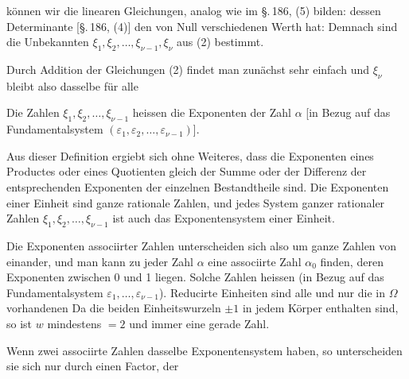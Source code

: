können wir die linearen Gleichungen, analog wie im \S.\,186, (5)
bilden:
dessen Determinante [\S.\,186, (4)] den von Null verschiedenen
Werth hat:
Demnach sind die Unbekannten $\xi_1, \xi_2, \ldots, \xi_{\nu-1}, \xi_\nu$ aus (2)
 bestimmt.

Durch Addition der Gleichungen (2) findet man zunächst
sehr einfach
und $\xi_\nu$ bleibt also dasselbe für alle 

Die Zahlen $\xi_1, \xi_2, \ldots, \xi_{\nu-1}$ heissen die Exponenten der
Zahl $\alpha$ [in Bezug auf das Fundamentalsystem $(\varepsilon_1, \varepsilon_2, \ldots, \varepsilon_{\nu-1})$].

Aus dieser Definition ergiebt sich ohne Weiteres, dass die
Exponenten eines Productes oder eines Quotienten gleich der
Summe oder der Differenz der entsprechenden Exponenten der
einzelnen Bestandtheile sind. Die Exponenten einer Einheit sind
ganze rationale Zahlen, und jedes System ganzer rationaler Zahlen
$\xi_1, \xi_2, \ldots, \xi_{\nu-1}$ ist auch das Exponentensystem einer Einheit.

Die Exponenten associirter Zahlen unterscheiden sich also
um ganze Zahlen von einander, und man kann zu jeder Zahl $\alpha$
eine associirte Zahl $\alpha_0$ finden, deren Exponenten zwischen 0
und 1 liegen. Solche Zahlen heissen  (in
Bezug auf das Fundamentalsystem $\varepsilon_1, \ldots, \varepsilon_{\nu-1}$). Reducirte Einheiten
sind alle und nur die in $\Omega$ vorhandenen  Da
die beiden Einheitswurzeln $\pm 1$ in jedem Körper enthalten sind,
so ist $w$ mindestens $= 2$ und immer eine gerade Zahl.

Wenn zwei associirte Zahlen dasselbe Exponentensystem
haben, so unterscheiden sie sich nur durch einen Factor, der
